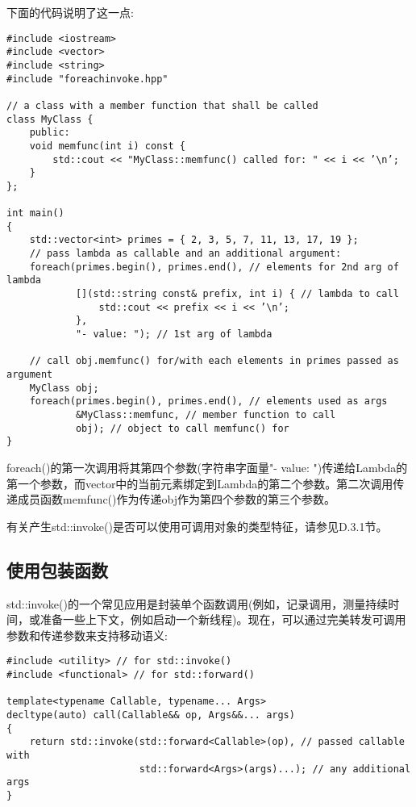 下面的代码说明了这一点:

\begin{lstlisting}[style=styleCXX]
#include <iostream>
#include <vector>
#include <string>
#include "foreachinvoke.hpp"

// a class with a member function that shall be called
class MyClass {
	public:
	void memfunc(int i) const {
		std::cout << "MyClass::memfunc() called for: " << i << ’\n’;
	}
};

int main()
{
	std::vector<int> primes = { 2, 3, 5, 7, 11, 13, 17, 19 };
	// pass lambda as callable and an additional argument:
	foreach(primes.begin(), primes.end(), // elements for 2nd arg of lambda
			[](std::string const& prefix, int i) { // lambda to call
				std::cout << prefix << i << ’\n’;
			},
			"- value: "); // 1st arg of lambda

	// call obj.memfunc() for/with each elements in primes passed as argument
	MyClass obj;
	foreach(primes.begin(), primes.end(), // elements used as args
			&MyClass::memfunc, // member function to call
			obj); // object to call memfunc() for
}
\end{lstlisting}

foreach()的第一次调用将其第四个参数(字符串字面量"- value: ")传递给Lambda的第一个参数，而vector中的当前元素绑定到Lambda的第二个参数。第二次调用传递成员函数memfunc()作为传递obj作为第四个参数的第三个参数。

有关产生std::invoke()是否可以使用可调用对象的类型特征，请参见D.3.1节。

\subsection{使用包装函数}

std::invoke()的一个常见应用是封装单个函数调用(例如，记录调用，测量持续时间，或准备一些上下文，例如启动一个新线程)。现在，可以通过完美转发可调用参数和传递参数来支持移动语义:

\begin{lstlisting}[style=styleCXX]
#include <utility> // for std::invoke()
#include <functional> // for std::forward()

template<typename Callable, typename... Args>
decltype(auto) call(Callable&& op, Args&&... args)
{
	return std::invoke(std::forward<Callable>(op), // passed callable with
					   std::forward<Args>(args)...); // any additional args
}
\end{lstlisting}

